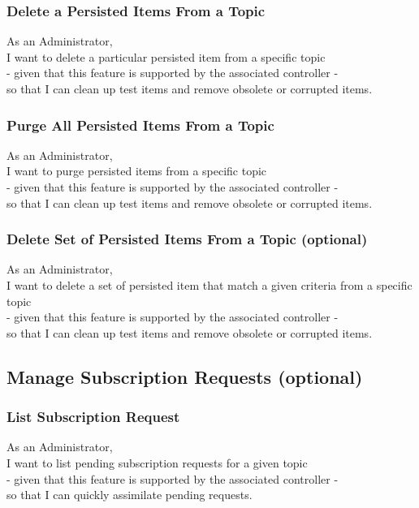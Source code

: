 \subsubsection{Delete a Persisted Items From a Topic}

As an Administrator,\\
I want to delete a particular persisted item from a specific topic\\
- given that this feature is supported by the associated controller -\\
so that I can clean up test items and remove obsolete or corrupted items.

\subsubsection{Purge All Persisted Items From a Topic}

As an Administrator,\\
I want to purge persisted items from a specific topic\\
- given that this feature is supported by the associated controller -\\
so that I can clean up test items and remove obsolete or corrupted items.

\subsubsection{Delete Set of Persisted Items From a Topic (optional)}

As an Administrator,\\
I want to delete a set of persisted item that match a given criteria from a specific topic\\
- given that this feature is supported by the associated controller -\\
so that I can clean up test items and remove obsolete or corrupted items.

\subsection{Manage Subscription Requests (optional)}\label{sec:subscription-requests}

\subsubsection{List Subscription Request}
As an Administrator,\\
I want to list pending subscription requests for a given topic\\
- given that this feature is supported by the associated controller -\\
so that I can quickly assimilate pending requests.


